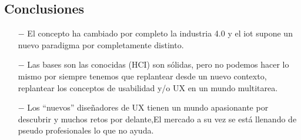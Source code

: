 \documentclass[11pt]{article}
\begin{document}
\begin{normalsize}
\begin{flushleft}
	\section{Conclusiones}
	    \begin{itemize}
	    \begin{enumerate}
		        \item [$-$] El concepto ha cambiado por completo  la industria 4.0 y el iot supone un nuevo paradigma por completamente distinto.
		        \item [$-$] Las bases son las conocidas (HCI) son sólidas, pero no podemos hacer lo mismo por siempre tenemos que replantear desde un nuevo contexto, replantear los conceptos de usabilidad y/o UX en un mundo multitarea.
		        \item [$-$] Los “nuevos” diseñadores de UX tienen un mundo apasionante por descubrir y muchos retos por delante,El mercado a su vez se está llenando de pseudo profesionales lo que no ayuda.
		       
		\end{enumerate}
		\end{itemize}




		\end{flushleft}
	\end{normalsize}
\end{document}
